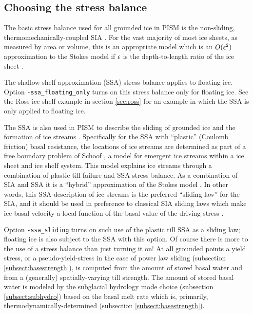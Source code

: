 \clearpage

\subsection{Choosing the stress balance}  \label{subsect:ssacontrol}

The basic stress balance used for all grounded ice in PISM is the non-sliding, thermomechanically-coupled SIA \cite{BBL}.  For the vast majority of most ice sheets, as measured by area or volume, this is an appropriate model which is an $O(\epsilon^2)$ approximation to the Stokes model if $\epsilon$ is the depth-to-length ratio of the ice sheet \cite{Fowler}.

The shallow shelf approximation (SSA) stress balance applies to floating ice.  Option \texttt{-ssa_floating_only} turns on this stress balance only for floating ice.  See the Ross ice shelf example in section \ref{sec:ross} for an example in which the SSA is only applied to floating ice.

The SSA is also used in PISM to describe the sliding of grounded ice and the formation of ice streams \cite{BBssasliding}.  Specifically for the SSA with ``plastic'' (Coulomb friction) basal resistance, the locations of ice streams are determined as part of a free boundary problem of Schoof \cite{SchoofStream}, a model for emergent ice streams within a ice sheet and ice shelf system.  This model explains ice streams through a combination of plastic till failure and SSA stress balance.  As a combination of SIA and SSA it is a ``hybrid'' approximation of the Stokes model \cite{BBssasliding,Winkelmannetal2011}.  In other words, this SSA description of ice streams is the preferred ``sliding law'' for the SIA, and it should be used in preference to classical SIA sliding laws which make ice basal velocity a local function of the basal value of the driving stress \cite{BBssasliding}.

Option \texttt{-ssa_sliding} turns on such use of the plastic till SSA as a sliding law; floating ice is also subject to the SSA with this option.  Of course there is more to the use of a stress balance than just turning it on!  At all grounded points a yield stress, or a pseudo-yield-stress in the case of power law sliding (subsection \ref{subsect:basestrength}), is computed from the amount of stored basal water and from a (generally) spatially-varying till strength.  The amount of stored basal water is modeled by the subglacial hydrology mode choice (subsection \ref{subsect:subhydro}) based on the basal melt rate which is, primarily, thermodynamically-determined (subsection \ref{subsect:basestrength}).

